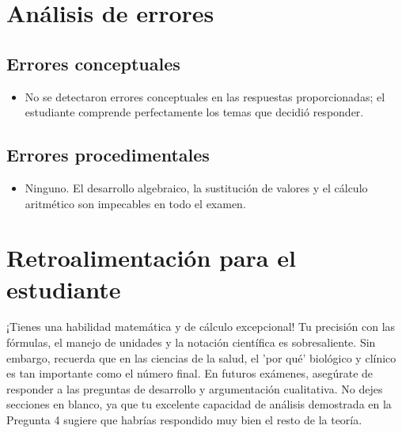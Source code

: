 \documentclass[11pt,a4paper]{article}
\begin{document}
\section*{Análisis de errores}

\subsection*{Errores conceptuales}
\begin{itemize}[leftmargin=1.5em, itemsep=2pt]
  \item No se detectaron errores conceptuales en las respuestas proporcionadas; el estudiante comprende perfectamente los temas que decidió responder.
\end{itemize}

\subsection*{Errores procedimentales}
\begin{itemize}[leftmargin=1.5em, itemsep=2pt]
  \item Ninguno. El desarrollo algebraico, la sustitución de valores y el cálculo aritmético son impecables en todo el examen.
\end{itemize}

\section*{Retroalimentación para el estudiante}
\begin{tcolorbox}[cajaRecomendacion, title={Dirigido a: Thomairys Sosa}]
¡Tienes una habilidad matemática y de cálculo excepcional! Tu precisión con las fórmulas, el manejo de unidades y la notación científica es sobresaliente. Sin embargo, recuerda que en las ciencias de la salud, el 'por qué' biológico y clínico es tan importante como el número final. En futuros exámenes, asegúrate de responder a las preguntas de desarrollo y argumentación cualitativa. No dejes secciones en blanco, ya que tu excelente capacidad de análisis demostrada en la Pregunta 4 sugiere que habrías respondido muy bien el resto de la teoría.
\end{tcolorbox}

\end{document}
